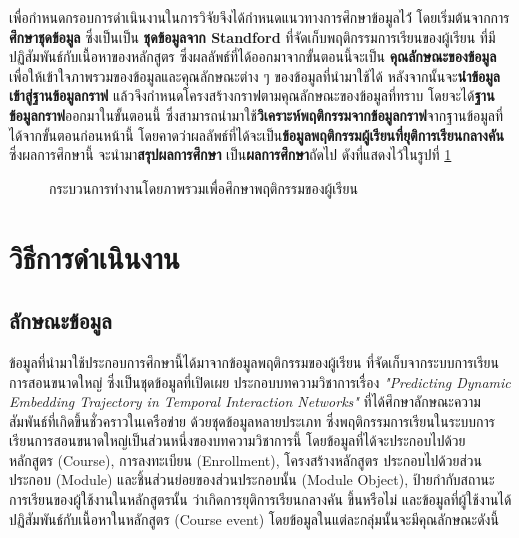 \documentclass[conference]{IEEEtran}
\def\moocs{การเรียนการสอนขนาดใหญ่}
\def\MOOCs{ระบบ{\moocs}}
\def\dropout{ยุติการเรียนกลางคัน}
\begin{document}
    เพื่อกำหนดกรอบการดำเนินงานในการวิจัยจึงได้กำหนดแนวทางการศึกษาข้อมูลไว้่
    โดยเริ่มต้นจากการ \textbf{ศึกษาชุดข้อมูล} ซึ่งเป็นเป็น \textbf{ชุดข้อมูลจาก Standford} 
    ที่จัดเก็บพฤติกรรมการเรียนของผู้เรียน ที่มีปฏิสัมพันธ์กับเนื้อหาของหลักสูตร 
    ซึ่งผลลัพธ์ที่ได้ออกมาจากขั้นตอนนี้จะเป็น \textbf{คุณลักษณะของข้อมูล} 
    เพื่อให้เข้าใจภาพรวมของข้อมูลและคุณลักษณะต่าง ๆ ของข้อมูลที่นำมาใช้ได้ 
    หลังจากนั้นจะ\textbf{นำข้อมูลเข้าสู่ฐานข้อมูลกราฟ}
    แล้วจึงกำหนดโครงสร้างกราฟตามคุณลักษณะของข้อมูลที่ทราบ 
    โดยจะได้\textbf{ฐานข้อมูลกราฟ}ออกมาในขั้นตอนนี้ 
    ซึ่งสามารถนำมาใช้\textbf{วิเคราะห์พฤติกรรมจากข้อมูลกราฟ}จากฐานข้อมูลที่ได้จากขั้นตอนก่อนหน้านี้
    โดยคาดว่าผลลัพธ์ที่ได้จะเป็น\textbf{ข้อมูลพฤติกรรมผู้เรียนที่{\dropout}} 
    ซึ่งผลการศึกษานี้ จะนำมา\textbf{สรุปผลการศึกษา} เป็น\textbf{ผลการศึกษา}ถัดไป
    ดังที่แสดงไว้ในรูปที่ \ref{fig:overview-process}
    \begin{figure}[htbp]
        \caption{กระบวนการทำงานโดยภาพรวมเพื่อศึกษาพฤติกรรมของผู้เรียน}
        \label{fig:overview-process}
    \end{figure}

    \section[method]{วิธีการดำเนินงาน}

    \subsection[datacharacteristics]{ลักษณะข้อมูล}
    ข้อมูลที่นำมาใช้ประกอบการศึกษานี้ได้มาจากข้อมูลพฤติกรรมของผู้เรียน ที่จัดเก็บจาก{\MOOCs} 
    ซึ่งเป็นชุดข้อมูลที่เปิดเผย ประกอบบทความวิชาการเรื่อง 
    \textit{"Predicting Dynamic Embedding Trajectory in Temporal Interaction Networks"} 
    \cite{DBLP:journals/corr/abs-1908-01207} ที่ได้ศึกษาลักษณะความสัมพันธ์ที่เกิดขึ้นชั่วคราวในเครือข่าย
    ด้วยชุดข้อมูลหลายประเภท ซึ่งพฤติกรรมการเรียนใน{\MOOCs}เป็นส่วนหนึ่งของบทความวิชาการนี้
    โดยข้อมูลที่ได้จะประกอบไปด้วย หลักสูตร (Course), การลงทะเบียน (Enrollment), 
    โครงสร้างหลักสูตร ประกอบไปด้วยส่วนประกอบ (Module) 
    และชิ้นส่วนย่อยของส่วนประกอบนั้น (Module Object), 
    ป้ายกำกับสถานะการเรียนของผู้ใช้งานในหลักสูตรนั้น ว่าเกิดการ{\dropout} ขึ้นหรือไม่
    และข้อมูลที่ผู้ใช้งานได้ปฏิสัมพันธ์กับเนื้อหาในหลักสูตร (Course event) \cite{mooc:stanforddataset} 
    โดยข้อมูลในแต่ละกลุ่มนั้นจะมีคุณลักษณะดังนี้
\end{document}
